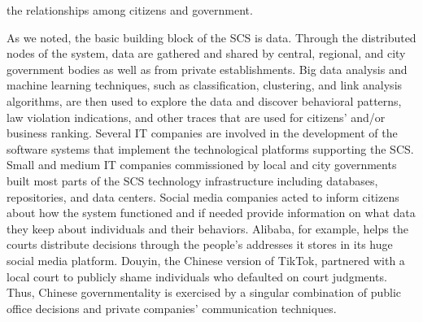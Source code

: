 the relationships among citizens and government.

As we noted, the basic building block of the SCS is data. Through the distributed nodes of the system, data are gathered and shared by central, regional, and city government bodies as well as from private establishments. Big data analysis and machine learning techniques, such as classification, clustering, and link analysis algorithms, are then used to explore the data and discover behavioral patterns, law violation indications, and other traces that are used for citizens'\vadjust{\vspace*{10pt}\pagebreak} and/or \hbox{business} ranking. Several IT companies are involved in the development of the software systems that implement the technological platforms supporting the SCS. Small and medium IT companies commissioned by local and city governments built most parts of the SCS technology infrastructure including databases, \hbox{repositories,} and data centers. Social media companies acted to inform citizens about how the system functioned and if needed provide information on what data they keep about individuals and their behaviors. Alibaba, for example, helps the courts distribute decisions through the people's addresses it stores in its huge social media platform. Douyin, the Chinese version of TikTok, partnered with a local court to publicly shame individuals who defaulted on court judgments. Thus, Chinese governmentality is exercised by a singular combination of public office decisions and private companies' communication techniques.

